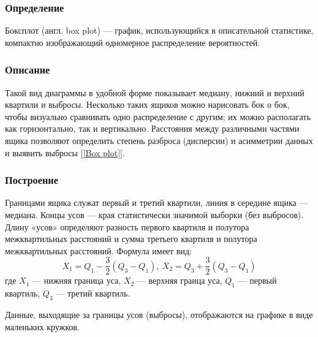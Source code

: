 \documentclass[12pt,a4paper]{article}
\begin{document}
	\subsubsection{Определение}
		Боксплот (англ. box plot) — график, использующийся в описательной статистике, компактно изображающий одномерное распределение вероятностей.
		
	\subsubsection{Описание}
		Такой вид диаграммы в удобной форме показывает медиану, нижний и верхний квартили и выбросы. Несколько таких ящиков можно нарисовать бок о бок, чтобы визуально сравнивать одно распределение с другим; их можно располагать как горизонтально, так и вертикально. Расстояния между различными частями ящика позволяют определить степень разброса (дисперсии) и асимметрии данных и выявить выбросы [\ref{Box plot}].
		
	\subsubsection{Построение}
		Границами ящика служат первый и третий квартили, линия в середине
		ящика — медиана. Концы усов — края статистически значимой выборки
		(без выбросов). Длину «усов» определяют разность первого квартиля и полутора межквартильных расстояний и сумма третьего квартиля и полутора
		межквартильных расстояний. Формула имеет вид:
		\begin{equation}\label{eqn:box_plot}
		X_1 = Q_1 - \frac{3}{2}(Q_3 - Q_1),\  X_2 = Q_3 + \frac{3}{2}(Q_3 - Q_1)
		\end{equation}
		где $X_1$ --- нижняя граница уса, $X_2$ --- верхняя граица уса, $Q_1$ --- первый квартиль, $Q_3$ --- третий квартиль.
		
		Данные, выходящие за границы усов (выбросы), отображаются на графике
		в виде маленьких кружков.
		
		
		
\end{document}
